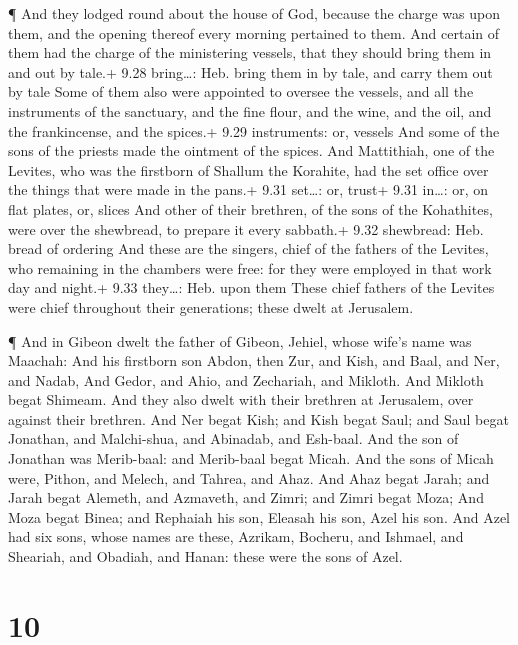  ¶ And they lodged round about the house of God, because
the charge was upon them, and the opening thereof every morning
pertained to them.  And certain of them had the charge of
the ministering vessels, that they should bring them in and out by
tale.+ 9.28 bring\ldots: Heb. bring them in by tale, and carry them out
by tale  Some of them also were appointed to oversee the
vessels, and all the instruments of the sanctuary, and the fine flour,
and the wine, and the oil, and the frankincense, and the spices.+ 9.29
instruments: or, vessels  And some of the sons of the
priests made the ointment of the spices.  And Mattithiah,
one of the Levites, who was the firstborn of Shallum the Korahite, had
the set office over the things that were made in the pans.+ 9.31
set\ldots: or, trust+ 9.31 in\ldots: or, on flat plates, or, slices
 And other of their brethren, of the sons of the
Kohathites, were over the shewbread, to prepare it every sabbath.+ 9.32
shewbread: Heb. bread of ordering  And these are the
singers, chief of the fathers of the Levites, who remaining in the
chambers were free: for they were employed in that work day and night.+
9.33 they\ldots: Heb. upon them  These chief fathers of the
Levites were chief throughout their generations; these dwelt at
Jerusalem.

 ¶ And in Gibeon dwelt the father of Gibeon, Jehiel, whose
wife's name was Maachah:  And his firstborn son Abdon, then
Zur, and Kish, and Baal, and Ner, and Nadab,  And Gedor,
and Ahio, and Zechariah, and Mikloth.  And Mikloth begat
Shimeam. And they also dwelt with their brethren at Jerusalem, over
against their brethren.  And Ner begat Kish; and Kish begat
Saul; and Saul begat Jonathan, and Malchi-shua, and Abinadab, and
Esh-baal.  And the son of Jonathan was Merib-baal: and
Merib-baal begat Micah.  And the sons of Micah were,
Pithon, and Melech, and Tahrea, and Ahaz.  And Ahaz begat
Jarah; and Jarah begat Alemeth, and Azmaveth, and Zimri; and Zimri begat
Moza;  And Moza begat Binea; and Rephaiah his son, Eleasah
his son, Azel his son.  And Azel had six sons, whose names
are these, Azrikam, Bocheru, and Ishmael, and Sheariah, and Obadiah, and
Hanan: these were the sons of Azel.

\hypertarget{section-9}{%
\section{10}\label{section-9}}

